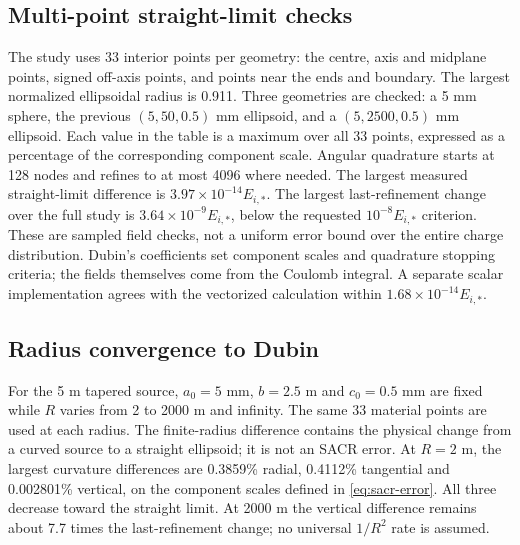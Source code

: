 \clearpage
\subsection{Multi-point straight-limit checks}
The study uses 33 interior points per geometry: the centre, axis and midplane
points, signed off-axis points, and points near the ends and boundary. The
largest normalized ellipsoidal radius is 0.911. Three geometries are checked:
a 5 mm sphere, the previous $(5,50,0.5)$ mm ellipsoid, and a
$(5,2500,0.5)$ mm ellipsoid. Each value in the table is a maximum over all
33 points, expressed as a percentage of the corresponding component scale.
Angular quadrature starts at 128 nodes and refines to at most 4096 where
needed. The largest measured straight-limit difference is
$3.97\times10^{-14}E_{i,*}$. The largest last-refinement change over the full
study is $3.64\times10^{-9}E_{i,*}$, below the requested $10^{-8}E_{i,*}$
criterion. These are sampled field checks, not a uniform error bound over the
entire charge distribution.
Dubin's coefficients set component scales and quadrature stopping criteria;
the fields themselves come from the Coulomb integral. A separate scalar
implementation agrees with the vectorized calculation within
$1.68\times10^{-14}E_{i,*}$.

\clearpage
\subsection{Radius convergence to Dubin}
For the 5 m tapered source, $a_0=5$ mm, $b=2.5$ m and $c_0=0.5$ mm are fixed
while $R$ varies from 2 to 2000 m and infinity. The same 33 material points
are used at each radius. The finite-radius difference contains the physical
change from a curved source to a straight ellipsoid; it is not an SACR error.
At $R=2$ m, the largest curvature differences are 0.3859\% radial,
0.4112\% tangential and 0.002801\% vertical, on the component scales defined
in \cref{eq:sacr-error}. All three decrease toward the straight limit. At
2000 m the vertical difference remains about 7.7 times the last-refinement
change; no universal $1/R^2$ rate is assumed.

